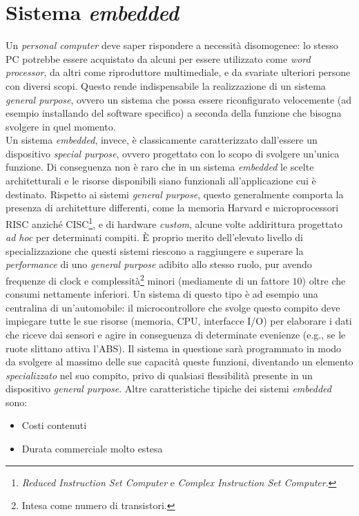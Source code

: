 \section{Sistema \emph{embedded}}
Un \emph{personal computer} deve saper rispondere a necessità disomogenee:
lo stesso PC potrebbe essere acquistato da alcuni per essere utilizzato come 
\emph{word processor}, da altri come riproduttore multimediale, e da svariate 
ulteriori persone con diversi scopi. Questo rende indispensabile la 
realizzazione di un sistema \emph{general purpose}, ovvero un sistema che possa 
essere riconfigurato velocemente (ad esempio installando del software 
specifico) a seconda della funzione che bisogna svolgere in quel momento.\\
Un sistema \emph{embedded}, invece, è classicamente caratterizzato dall'essere 
un dispositivo 
\emph{special purpose}, ovvero progettato con lo scopo di svolgere un'unica 
funzione. Di conseguenza non è raro che in un sistema \emph{embedded} 
le scelte architetturali e le risorse disponibili siano funzionali
all'applicazione cui è destinato. Rispetto ai sistemi \emph{general purpose}, 
questo generalmente comporta la presenza di architetture differenti, come la 
memoria Harvard e microprocessori RISC anziché CISC\footnote{\emph{Reduced 
Instruction Set Computer} e \emph{Complex Instruction Set Computer}.}, e di 
hardware 
\emph{custom}, 
alcune volte addirittura progettato \emph{ad hoc} per determinati compiti.
\`E proprio 
merito dell'elevato livello di 
specializzazione che questi sistemi riescono a raggiungere e superare la 
\emph{performance} di uno \emph{general purpose} adibito allo stesso ruolo, pur 
avendo frequenze di clock e complessità\footnote{Intesa come numero di 
transistori.} minori (mediamente di un fattore $10$) oltre che consumi 
nettamente 
inferiori.
Un sistema di questo tipo è ad esempio una centralina di un'automobile: il 
microcontrollore che svolge questo compito deve impiegare tutte le sue risorse 
(memoria, CPU, interfacce I/O) per elaborare i dati che riceve dai sensori e 
agire in conseguenza di determinate evenienze (e.g., se le ruote slittano 
attiva l'ABS). Il sistema in questione sarà programmato in modo da 
svolgere al massimo delle sue capacità queste funzioni, diventando un elemento 
\emph{specializzato} nel suo compito, privo di qualsiasi flessibilità presente 
in un dispositivo \emph{general purpose}.
Altre caratteristiche tipiche dei sistemi \emph{embedded} sono:
\begin{itemize}
\item Costi contenuti
\item Durata commerciale molto estesa
\end{itemize}
